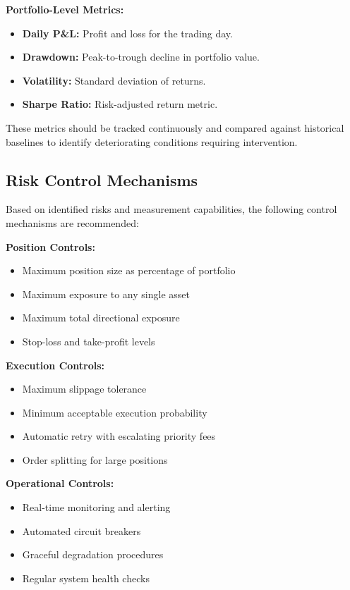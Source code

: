 \documentclass[12pt,a4paper]{article}
\begin{document}
\textbf{Portfolio-Level Metrics:}
\begin{itemize}
\item \textbf{Daily P\&L:} Profit and loss for the trading day.
\item \textbf{Drawdown:} Peak-to-trough decline in portfolio value.
\item \textbf{Volatility:} Standard deviation of returns.
\item \textbf{Sharpe Ratio:} Risk-adjusted return metric.
\end{itemize}

These metrics should be tracked continuously and compared against historical baselines to identify deteriorating conditions requiring intervention.

\subsection{Risk Control Mechanisms}

Based on identified risks and measurement capabilities, the following control mechanisms are recommended:

\textbf{Position Controls:}
\begin{itemize}
\item Maximum position size as percentage of portfolio
\item Maximum exposure to any single asset
\item Maximum total directional exposure
\item Stop-loss and take-profit levels
\end{itemize}

\textbf{Execution Controls:}
\begin{itemize}
\item Maximum slippage tolerance
\item Minimum acceptable execution probability
\item Automatic retry with escalating priority fees
\item Order splitting for large positions
\end{itemize}

\textbf{Operational Controls:}
\begin{itemize}
\item Real-time monitoring and alerting
\item Automated circuit breakers
\item Graceful degradation procedures
\item Regular system health checks
\end{itemize}
\end{document}
